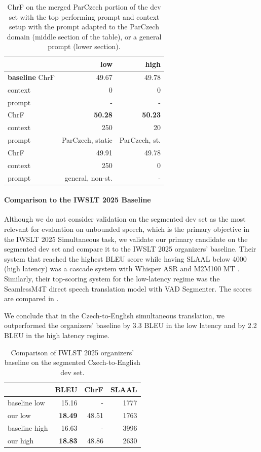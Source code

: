 \documentclass[11pt]{article}
\begin{document}
\begin{table}[]
    \centering
    \begin{tabular}{l|r|r}
         & \textbf{low} & \textbf{high} \\
         \hline
\textbf{baseline} ChrF  &  49.67 & 49.78 \\
context & 0 & 0 \\
prompt & - & - \\
\hline
ChrF  & \textbf{50.28} & \textbf{50.23} \\
context   &  250 & 20 \\
prompt    & ParCzech, static & ParCzech, st. \\
\hline
ChrF & 49.91 & 49.78 \\
context & 250 & 0 \\
prompt & general, non-st. & -

    \end{tabular}
    \caption{ChrF on the merged ParCzech portion of the dev set with the top performing prompt and context setup with the prompt adapted to the ParCzech domain (middle section of the table), or a general prompt (lower section).}
    \label{tab:prompt}
\end{table}


\paragraph{Comparison to  the IWSLT 2025 Baseline}

Although we do not consider validation on the segmented dev set as the most relevant for evaluation on unbounded speech, which is the primary objective in the IWSLT 2025 Simultaneous task, we validate our primary candidate on the segmented dev set and compare it to the IWSLT 2025 organizers' baseline. Their system that reached the highest BLEU score while having SLAAL below 4000 (high latency) was a cascade system with Whisper ASR and M2M100 MT \cite{m2m100}. Similarly, their top-scoring system for the low-latency regime was the SeamlessM4T \cite{seamless2023} direct speech translation model with VAD Segmenter.
The scores are compared in . 

We conclude that in the Czech-to-English simultaneous translation, we outperformed the organizers' baseline by 3.3 BLEU in the low latency and by 2.2 BLEU in the high latency regime.

\begin{table}[]
    \centering
    \begin{tabular}{l|rrr}
& BLEU & ChrF & SLAAL \\
\hline
 baseline low & 15.16 & - & 1777 \\
our low &  \textbf{18.49} & 48.51 & 1763 \\ 
\hline
baseline high & 16.63 & - & 3996 \\
our high & \textbf{18.83} & 48.86 & 2630 \\
    \end{tabular}
    \caption{Comparison of IWLST 2025 organizers' baseline on the segmented Czech-to-English dev set.}
    \label{tab:baseline}
\end{table}
\end{document}
